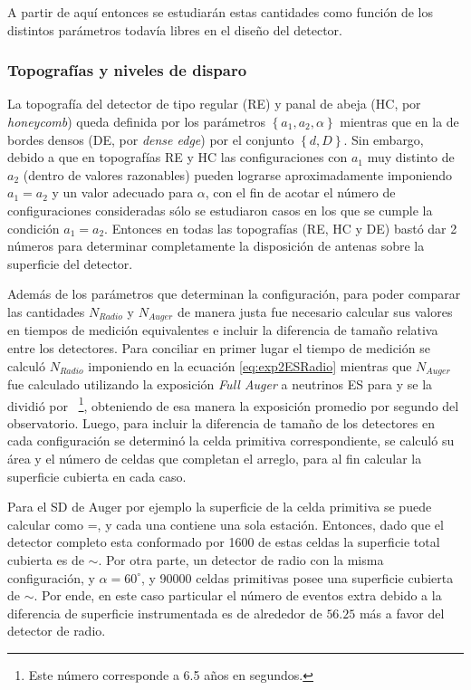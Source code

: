	A partir de aqu\'i entonces se estudiar\'an estas cantidades como funci\'on de los distintos par\'ametros todav\'ia libres en el dise\~no del detector.
	
	\subsubsection{Topograf\'ias y niveles de disparo}
	
	La topograf\'ia del detector de tipo regular (RE) y panal de abeja (HC, por \emph{honeycomb}) queda definida por los par\'ametros $\left\{a_1,a_2,\alpha\right\}$ mientras que en la de bordes densos (DE, por \emph{dense edge}) por el conjunto $\left\{d,D\right\}$.
	Sin embargo, debido a que en topograf\'ias RE y HC las configuraciones con $a_1$ muy distinto de $a_2$ (dentro de valores razonables) pueden lograrse aproximadamente imponiendo $a_1=a_2$ y un valor adecuado para $\alpha$, con el fin de acotar el n\'umero de configuraciones consideradas s\'olo se estudiaron casos en los que se cumple la condici\'on $a_1=a_2$.
	Entonces en todas las topograf\'ias (RE, HC y DE) bast\'o dar 2 n\'umeros para determinar completamente la disposici\'on de antenas sobre la superficie del detector.
	
	Adem\'as de los par\'ametros que determinan la configuraci\'on, para poder comparar las cantidades $N_{Radio}$ y $N_{Auger}$ de manera justa fue necesario calcular sus valores en tiempos de medici\'on equivalentes e incluir la diferencia de tama\~no relativa entre los detectores.
	Para conciliar en primer lugar el tiempo de medici\'on se calcul\'o $N_{Radio}$ imponiendo  en la ecuaci\'on \ref{eq:exp2ESRadio} mientras que $N_{Auger}$ fue calculado utilizando la exposici\'on \emph{Full Auger} a neutrinos ES para  y se la dividi\'o por ~\footnote{Este n\'umero corresponde a 6.5 a\~nos en segundos.}, obteniendo de esa manera la exposici\'on promedio por segundo del observatorio.
	Luego, para incluir la diferencia de tama\~no de los detectores en cada configuraci\'on se determin\'o la celda primitiva correspondiente, se calcul\'o su \'area y el n\'umero de celdas que completan el arreglo, para al fin calcular la superficie cubierta en cada caso.
	
	Para el SD de Auger por ejemplo la superficie de la celda primitiva se puede calcular como =, y cada una contiene una sola estaci\'on.
	Entonces, dado que el detector completo esta conformado por 1600 de estas celdas la superficie total cubierta es de $\sim$.
	Por otra parte, un detector de radio con la misma configuraci\'on,  y $\alpha=60^\circ$, y 90000 celdas primitivas posee una superficie cubierta de $\sim$.
	Por ende, en este caso particular el n\'umero de eventos extra debido a la diferencia de superficie instrumentada es de alrededor de $56.25$ m\'as a favor del detector de radio.
	
